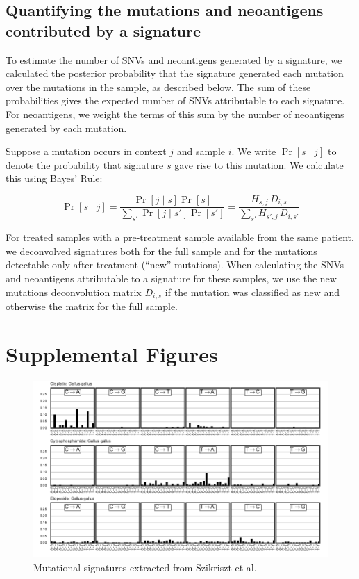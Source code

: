 

\subsection*{Quantifying the mutations and neoantigens contributed by a signature}
To estimate the number of SNVs and neoantigens generated by a signature, we calculated the posterior probability that the signature generated each mutation over the mutations in the sample, as described below. The sum of these probabilities gives the expected number of SNVs attributable to each signature. For neoantigens, we weight the terms of this sum by the number of neoantigens generated by each mutation.

Suppose a mutation occurs in context $j$ and sample $i$. We write $\Pr[s \mid j]$ to denote the probability that signature $s$ gave rise to this mutation. We calculate this using Bayes' Rule:

\[
\Pr[s \mid j] = \frac{\Pr[j \mid s] \Pr[s]}{\sum_{s'}{\Pr[j \mid s']\Pr[s']}} = \frac{H_{s,j} \, D_{i,s}}{\sum_{s'}{H_{s',j} \, D_{i,s'}}}
\]

For treated samples with a pre-treatment sample available from the same patient, we deconvolved signatures both for the full sample and for the mutations detectable only after treatment (``new'' mutations). When calculating the SNVs and neoantigens attributable to a signature for these samples, we use the new mutations deconvolution matrix $D_{i,s}$ if the mutation was classified as new and otherwise the matrix for the full sample.

\section*{Supplemental Figures}

\FloatBarrier

\begin{figure}
\centering
\includegraphics[scale=1.0]{figures/extracted_signatures_chicken.pdf}
\caption{Mutational signatures extracted from Szikriszt et al.~\cite{Szikriszt_2016}}
\label{fig:supp_extracted_signatures_chicken}
\end{figure}

